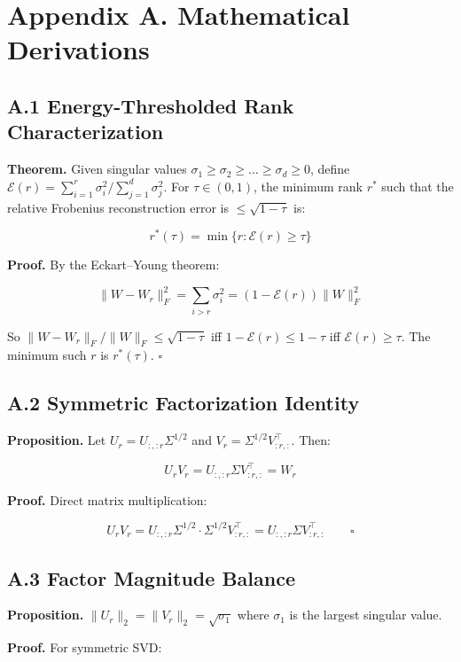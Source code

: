 
\section{Appendix A. Mathematical Derivations}

\subsection{A.1 Energy-Thresholded Rank Characterization}

\textbf{Theorem.} Given singular values $\sigma_1 \geq \sigma_2 \geq \dots \geq \sigma_d \geq 0$, 
define $\mathcal{E}(r) = \sum_{i=1}^r \sigma_i^2 / \sum_{j=1}^d \sigma_j^2$. For 
$\tau \in (0, 1)$, the minimum rank $r^*$ such that the relative Frobenius 
reconstruction error is $\leq \sqrt{1 - \tau}$ is:

\[
r^*(\tau) = \min\{r : \mathcal{E}(r) \geq \tau\}
\tag{A.1}
\]

\textbf{Proof.} By the Eckart--Young theorem:

\[
\|W - W_r\|_F^2 = \sum_{i > r} \sigma_i^2 = (1 - \mathcal{E}(r)) \|W\|_F^2
\tag{A.2}
\]

So $\|W - W_r\|_F / \|W\|_F \leq \sqrt{1 - \tau}$ iff $1 - \mathcal{E}(r) \leq 1 - \tau$ 
iff $\mathcal{E}(r) \geq \tau$. The minimum such $r$ is $r^*(\tau)$. $\square$

\subsection{A.2 Symmetric Factorization Identity}

\textbf{Proposition.} Let $U_r = U_{:, :r} \Sigma^{1/2}$ and $V_r = \Sigma^{1/2} V_{:r, :}^\top$. 
Then:

\[
U_r V_r = U_{:, :r} \Sigma V_{:r, :}^\top = W_r
\tag{A.3}
\]

\textbf{Proof.} Direct matrix multiplication:

\[
U_r V_r = U_{:, :r} \Sigma^{1/2} \cdot \Sigma^{1/2} V_{:r, :}^\top = U_{:, :r} \Sigma V_{:r, :}^\top \qquad \square
\]

\subsection{A.3 Factor Magnitude Balance}

\textbf{Proposition.} $\|U_r\|_2 = \|V_r\|_2 = \sqrt{\sigma_1}$ where $\sigma_1$ is 
the largest singular value.

\textbf{Proof.} For symmetric SVD:


